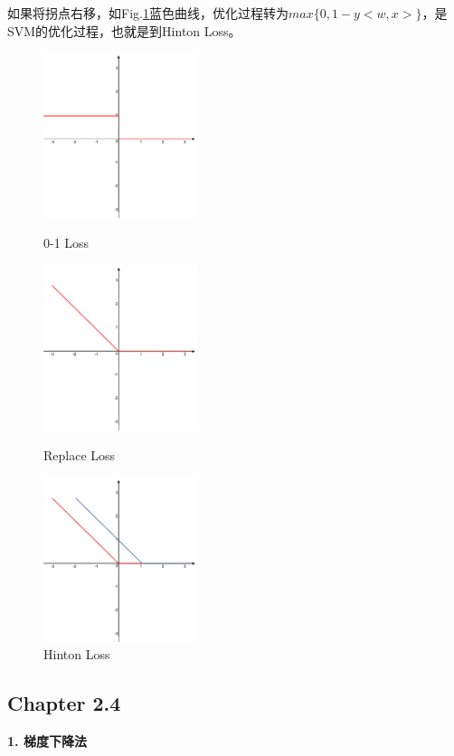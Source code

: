 \documentclass[12pt,UTF8,AutoFakeBold]{article}
\begin{document}
如果将拐点右移，如Fig.\ref{fig3}蓝色曲线，优化过程转为\(max\{0, 1-y<w,x>\}\)，是SVM的优化过程，也就是到Hinton Loss。
\begin{figure}[htbp]
\centering
\begin{minipage}[t]{0.3\textwidth}
\centering
\includegraphics[width=4.5cm]{figs/0-1.png}
\caption{0-1 Loss}
\label{fig1} 
\end{minipage}
\begin{minipage}[t]{0.3\textwidth}
\centering
\includegraphics[width=4.5cm]{figs/-z.png}
\caption{Replace Loss}
\label{fig2} 
\end{minipage}
\begin{minipage}[t]{0.3\textwidth}
\centering
\includegraphics[width=4.5cm]{figs/hinton.png}
\caption{Hinton Loss}
\label{fig3} 
\end{minipage}
\end{figure}

\subsection{Chapter 2.4  }
\textbf{1. 梯度下降法}
\end{document}
